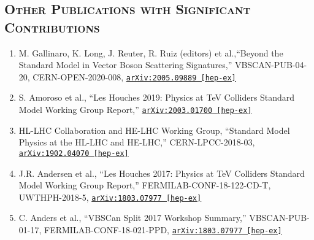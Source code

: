 \documentclass[10pt]{res} %
\begin{document}
\begin{resume}
\section{\textsc{Other Publications with Significant Contributions}}
\begin{enumerate}
  \item M. Gallinaro, K. Long, J. Reuter, R. Ruiz (editors) et al.,``Beyond the Standard Model in Vector Boson Scattering Signatures,''
    VBSCAN-PUB-04-20, CERN-OPEN-2020-008, \href{https://arxiv.org/abs/2005.09889}{\texttt{arXiv:2005.09889 [hep-ex]}}
  \item S. Amoroso et al., ``Les Houches 2019: Physics at TeV Colliders Standard Model Working Group Report,''
    \href{https://arxiv.org/abs/2003.01700 } {\texttt{arXiv:2003.01700 [hep-ex]}}
  \item HL-LHC Collaboration and HE-LHC Working Group, ``Standard Model Physics at the HL-LHC and HE-LHC,''
    CERN-LPCC-2018-03, \href{https://arxiv.org/abs/1902.04070}{\texttt{arXiv:1902.04070 [hep-ex]}}
  \item J.R. Andersen et al., ``Les Houches 2017: Physics at TeV Colliders Standard Model Working Group Report,''
    FERMILAB-CONF-18-122-CD-T, UWTHPH-2018-5, \href{https://arxiv.org/abs/1803.07977}{\texttt{arXiv:1803.07977 [hep-ex]}}
  \item C. Anders et al., ``VBSCan Split 2017 Workshop Summary,'' 
    VBSCAN-PUB-01-17, FERMILAB-CONF-18-021-PPD, \href{https://arxiv.org/abs/1801.04203}{\texttt{arXiv:1803.07977  [hep-ex]}}
\end{enumerate}


\end{resume}
\end{document}
